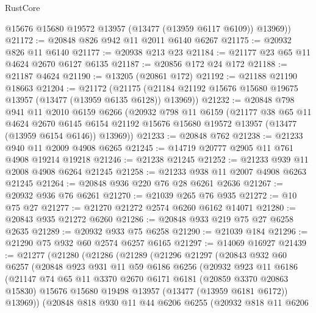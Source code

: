 \begin{lexlean}{RustCore}
\begin{coremodule}
        @15676
        @15680
        @19572
        @13957
        (@13477 (@13959 @6117 @6109))
        @13969))
@21172 := @20848 @826 @942 @11 @2011 @6140 @6267
@21175 := @20932 @826 @11 @6140
@21177 := @20938 @213 @23
@21184 := @21177 @23 @65 @11 @4624 @2670 @6127 @6135
@21187 := @20856 @172 @24 @172
@21188 := @21187 @4624
@21190 := @13205 (@20861 @172)
@21192 := @21188 @21190 @18663
@21204 := @21172
    (@21175 (@21184 @21192 @15676 @15680 @19675 @13957 (@13477 (@13959 @6135 @6128)) @13969))
@21232 := @20848
    @798
    @941
    @11
    @2010
    @6159
    @6266
    (@20932
      @798
      @11
      @6159
      (@21177
        @38
        @65
        @11
        @4624
        @2670
        @6145
        @6154
        @21192
        @15676
        @15680
        @19572
        @13957
        (@13477 (@13959 @6154 @6146))
        @13969))
@21233 := @20848 @762
@21238 := @21233 @940 @11 @2009 @4908 @6265
@21245 := @14719 @20777 @2905 @11 @761 @4908 @19214 @19218
@21246 := @21238 @21245
@21252 := @21233 @939 @11 @2008 @4908 @6264 @21245
@21258 := @21233 @938 @11 @2007 @4908 @6263 @21245
@21264 := @20848 @936 @220 @76 @28 @6261 @2636
@21267 := @20932 @936 @76 @6261
@21270 := @21039 @265 @76 @935
@21272 := @10 @75 @27
@21277 := @21270 @21272 @2574 @6260 @6162 @14071
@21280 := @20843 @935 @21272 @6260
@21286 := @20848 @933 @219 @75 @27 @6258 @2635
@21289 := @20932 @933 @75 @6258
@21290 := @21039 @184
@21296 := @21290 @75 @932 @60 @2574 @6257 @6165
@21297 := @14069 @16927
@21439 := @21277
    (@21280
      (@21286
        (@21289
          (@21296
            @21297
            (@20843
              @932
              @60
              @6257
              (@20848
                @923
                @931
                @11
                @59
                @6186
                @6256
                (@20932
                  @923
                  @11
                  @6186
                  (@21147
                    @74
                    @65
                    @11
                    @3370
                    @2670
                    @6171
                    @6181
                    (@20859 @3370 @20863 @15830)
                    @15676
                    @15680
                    @19498
                    @13957
                    (@13477 (@13959 @6181 @6172))
                    @13969))
                (@20848
                  @818
                  @930
                  @11
                  @44
                  @6206
                  @6255
                  (@20932
                    @818
                    @11
                    @6206

\end{coremodule}
\end{lexlean}

